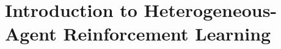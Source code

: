 \begin{comment}
    3.3 Applications of MARL
	•	Autonomous Driving: Coordinated control of multiple autonomous vehicles to improve traffic flow and safety.
	•	Robotics: Multi-robot systems for tasks such as search and rescue, where robots must collaborate to achieve a common objective.
	•	Economics and Finance: Modeling and simulation of market dynamics involving multiple agents with competing interests.
	•	Healthcare: Optimizing the allocation of resources and coordination of treatments across multiple healthcare providers.
	•	Key Paper: Yang, Y. et al. (2023). Efficient policy learning in large-scale heterogeneous-agent environments.
    3.2 Advances in MARL
    The advancement of MARL includes the development of algorithms that allow agents to learn in environments with other learning agents, leading to applications in fields such as robotics, game theory, and economics.
        •	Key Paper: Busoniu, L., Babuska, R., & De Schutter, B. (2008). A comprehensive survey of multi-agent reinforcement learning.
        •	Key Paper: Mnih, V. et al. (2015). Human-level control through deep reinforcement learning.
        •	Key Paper: Silver, D. et al. (2017). Mastering the game of Go without human knowledge.
\end{comment}


\section{Introduction to Heterogeneous-Agent Reinforcement Learning}





